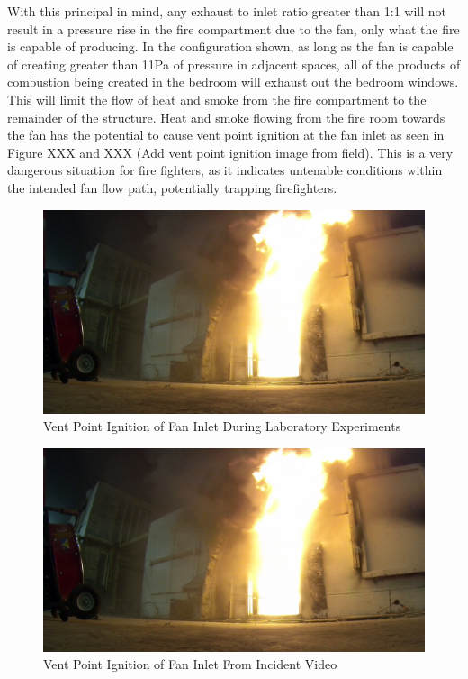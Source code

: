 \documentclass{article}
\begin{document}
With this principal in mind, any exhaust to inlet ratio greater than 1:1 will not result in a pressure rise in the fire compartment due to the fan, only what the fire is capable of producing. In the configuration shown, as long as the fan is capable of creating greater than 11Pa of pressure in adjacent spaces, all of the products of combustion being created in the bedroom will exhaust out the bedroom windows. This will limit the flow of heat and smoke from the fire compartment to the remainder of the structure. Heat and smoke flowing from the fire room towards the fan has the potential to cause vent point ignition at the fan inlet as seen in Figure XXX and XXX (Add vent point ignition image from field). This is a very dangerous situation for fire fighters, as it indicates untenable conditions within the intended fan flow path, potentially trapping firefighters.

\begin{figure}
	\centering
	\includegraphics[width = 5in]{0_Images/Tactical_Considerations/PPA_Exhaust_Dependant/Vent_Point_Ignition.png}
	\caption{Vent Point Ignition of Fan Inlet During Laboratory Experiments}
	\label{fig:VentPointIgnitionLab}
\end{figure}

\begin{figure}
	\centering
	\includegraphics[width = 5in]{0_Images/Tactical_Considerations/PPA_Exhaust_Dependant/Vent_Point_Ignition.png}
	\caption{Vent Point Ignition of Fan Inlet From Incident Video}
	\label{fig:VentPointIgnitionField}
	\end{figure}
\end{document}
